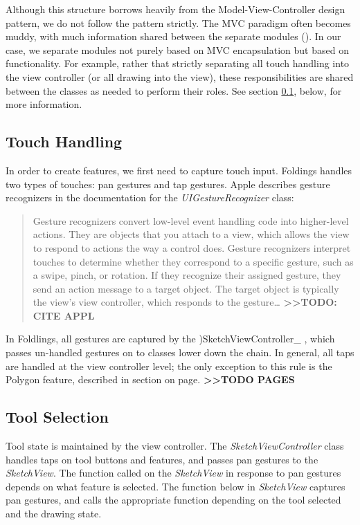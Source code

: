 Although this structure borrows heavily from the Model-View-Controller
design pattern, we do not follow the pattern strictly. The MVC paradigm
often becomes muddy, with much information shared between the separate
modules (\citet{veit2003model}). In our case, we separate modules not
purely based on MVC encapsulation but based on functionality. For
example, rather that strictly separating all touch handling into the
view controller (or all drawing into the view), these responsibilities
are shared between the classes as needed to perform their roles. See
section \ref{touch-handling}, below, for more information.

\subsection{Touch Handling}\label{touch-handling}

In order to create features, we first need to capture touch input.
Foldings handles two types of touches: pan gestures and tap gestures.
Apple describes gesture recognizers in the documentation for the
\emph{UIGestureRecognizer} class:

\begin{quote}
Gesture recognizers convert low-level event handling code into
higher-level actions. They are objects that you attach to a view, which
allows the view to respond to actions the way a control does. Gesture
recognizers interpret touches to determine whether they correspond to a
specific gesture, such as a swipe, pinch, or rotation. If they recognize
their assigned gesture, they send an action message to a target object.
The target object is typically the view's view controller, which
responds to the gesture\ldots{}
\textbf{\textgreater{}\textgreater{}TODO: CITE APPL}
\end{quote}

In Foldlings, all gestures are captured by the )SketchViewController\_ ,
which passes un-handled gestures on to classes lower down the chain. In
general, all taps are handled at the view controller level; the only
exception to this rule is the Polygon feature, described in section on
page. \textbf{\textgreater{}\textgreater{}TODO PAGES}

\subsection{Tool Selection}\label{tool-selection}

Tool state is maintained by the view controller. The
\emph{SketchViewController} class handles taps on tool buttons and
features, and passes pan gestures to the \emph{SketchView}. The function
called on the \emph{SketchView} in response to pan gestures depends on
what feature is selected. The function below in \emph{SketchView}
captures pan gestures, and calls the appropriate function depending on
the tool selected and the drawing state.

